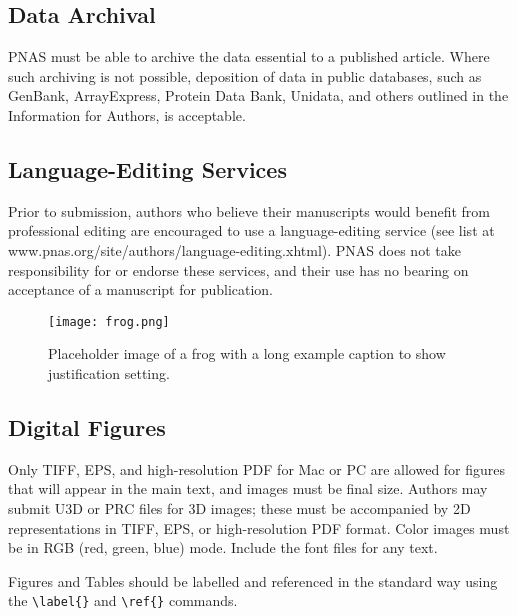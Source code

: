 \documentclass[9pt,twocolumn,twoside,]{pnas-new}
\begin{document}
\hypertarget{data-archival}{%
\subsection*{Data Archival}\label{data-archival}}

PNAS must be able to archive the data essential to a published article.
Where such archiving is not possible, deposition of data in public
databases, such as GenBank, ArrayExpress, Protein Data Bank, Unidata,
and others outlined in the Information for Authors, is acceptable.

\hypertarget{language-editing-services}{%
\subsection*{Language-Editing
Services}\label{language-editing-services}}

Prior to submission, authors who believe their manuscripts would benefit
from professional editing are encouraged to use a language-editing
service (see list at www.pnas.org/site/authors/language-editing.xhtml).
PNAS does not take responsibility for or endorse these services, and
their use has no bearing on acceptance of a manuscript for publication.

\begin{figure}
\centering
\texttt{[image: frog.png]}
\caption{Placeholder image of a frog with a long example caption to show
justification setting.}
\end{figure}

\hypertarget{sec:figures}{%
\subsection*{Digital Figures}\label{sec:figures}}

Only TIFF, EPS, and high-resolution PDF for Mac or PC are allowed for
figures that will appear in the main text, and images must be final
size. Authors may submit U3D or PRC files for 3D images; these must be
accompanied by 2D representations in TIFF, EPS, or high-resolution PDF
format. Color images must be in RGB (red, green, blue) mode. Include the
font files for any text.

Figures and Tables should be labelled and referenced in the standard way
using the \texttt{\textbackslash{}label\{\}} and
\texttt{\textbackslash{}ref\{\}} commands.
\end{document}
